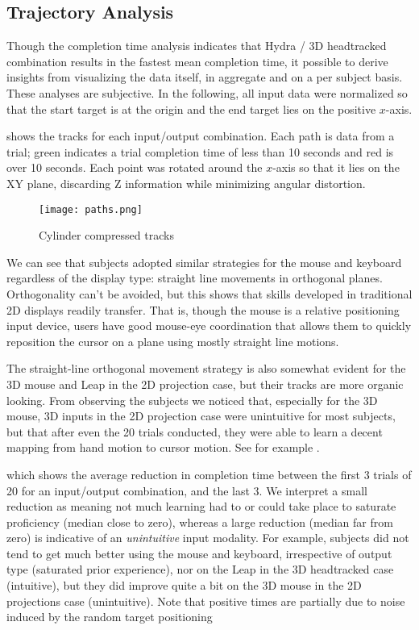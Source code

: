 \subsection{Trajectory Analysis}\label{sec:trajectory}

Though the completion time analysis indicates that Hydra / 3D headtracked
combination results in the fastest mean completion time, it possible to derive
insights from visualizing the data itself, in aggregate and on a per subject
basis.  These analyses are subjective.  In the following, all input data were
normalized so that the start target is at the origin and the end target lies
on the positive $x$-axis.

 shows the tracks for each input/output
combination. Each path is data from a trial; green indicates a trial
completion time of less than 10 seconds and red is over 10 seconds.  Each
point was rotated around the $x$-axis so that it lies on the XY plane,
discarding Z information while minimizing angular distortion.

\begin{figure}
    \centering
    \texttt{[image: paths.png]}
    \caption{Cylinder compressed tracks}
    \label{fig:compressedtracks}
\end{figure}

We can see that subjects adopted similar strategies for the mouse and keyboard
regardless of the display type: straight line movements in orthogonal planes.
Orthogonality can't be avoided, but this shows that skills developed in
traditional 2D displays readily transfer.  That is, though the mouse is a
relative positioning input device, users have good mouse-eye coordination that
allows them to quickly reposition the cursor on a plane using mostly straight
line motions.

The straight-line orthogonal movement strategy is also somewhat evident for
the 3D mouse and Leap in the 2D projection case, but their tracks are more
organic looking.  From observing the subjects we noticed that, especially for
the 3D mouse, 3D inputs in the 2D projection case were unintuitive for most
subjects, but that after even the 20 trials conducted, they were able to learn
a decent mapping from hand motion to cursor motion.  See for example
.

 which shows the average reduction in completion
time between the first 3 trials of 20 for an input/output combination, and the
last 3.  We interpret a small reduction as meaning not much learning had to or
could take place to saturate proficiency (median close to zero), whereas a
large reduction (median far from zero) is indicative of an \emph{unintuitive}
input modality.  For example, subjects did not tend to get much better using
the mouse and keyboard, irrespective of output type (saturated prior
experience), nor on the Leap in the 3D headtracked case (intuitive), but they
did improve quite a bit on the 3D mouse in the 2D projections case
(unintuitive).  Note that positive times are partially due to noise induced by
the random target positioning

